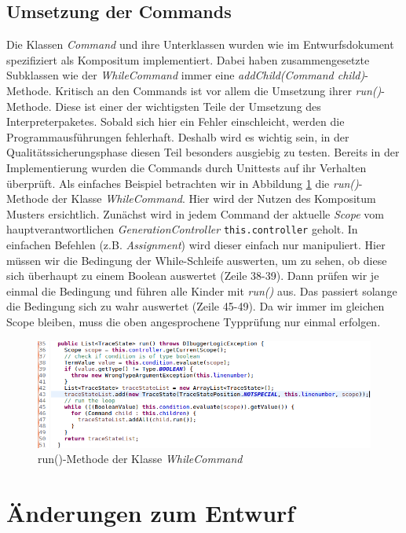 \documentclass[parskip=full]{scrartcl}
\begin{document}
\subsection{Umsetzung der Commands}
Die Klassen \textit{Command} und ihre Unterklassen wurden wie im Entwurfsdokument spezifiziert als Kompositum implementiert. Dabei haben zusammengesetzte Subklassen wie der \textit{WhileCommand} immer eine \textit{addChild(Command child)}-Methode. Kritisch an den Commands ist vor allem die Umsetzung ihrer \textit{run()}-Methode. Diese ist einer der wichtigsten Teile der Umsetzung des Interpreterpaketes. Sobald sich hier ein Fehler einschleicht, werden die Programmausführungen fehlerhaft. Deshalb wird es wichtig sein, in der Qualitätssicherungsphase diesen Teil besonders ausgiebig zu testen. Bereits in der Implementierung wurden die Commands durch Unittests auf ihr Verhalten überprüft. 
Als einfaches Beispiel betrachten wir in Abbildung \ref{runWhile} die \textit{run()}-Methode der Klasse \textit{WhileCommand}. Hier wird der Nutzen des Kompositum Musters ersichtlich.
Zunächst wird in jedem Command der aktuelle \textit{Scope} vom hauptverantwortlichen \textit{GenerationController} \texttt{this.controller} geholt. In einfachen Befehlen (z.B. \textit{Assignment}) wird dieser einfach nur manipuliert. Hier müssen wir die Bedingung der While-Schleife auswerten, um zu sehen, ob diese sich überhaupt zu einem Boolean auswertet (Zeile 38-39). Dann prüfen wir je einmal die Bedingung und führen alle Kinder mit \textit{run()} aus. Das passiert solange die Bedingung sich zu wahr auswertet (Zeile 45-49). Da wir immer im gleichen Scope bleiben, muss die oben angesprochene Typprüfung nur einmal erfolgen.
\begin{figure}[!h]
\includegraphics[width=1.0\textwidth]{document_data/runWhile.png}
\caption{run()-Methode der Klasse \textit{WhileCommand}}
\label{runWhile}
\end{figure}
\section{Änderungen zum Entwurf}
\end{document}
